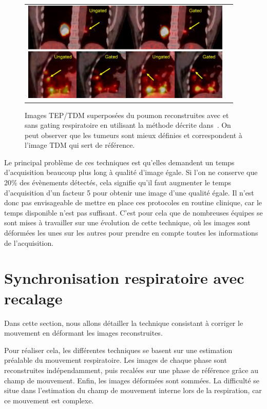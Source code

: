 \begin{figure}[h!]
	\begin{center}
		\begin{tabular}{c c}
			\includegraphics[width=10cm]{images/chang2010}
		\end{tabular}
	\end{center}
	\caption{Images TEP/TDM superposées du poumon reconstruites avec et sans gating respiratoire en utilisant la méthode décrite dans~\cite{GuopingChang2010Implementation}. On peut observer que les tumeurs sont mieux définies et correspondent à l'image TDM qui sert de référence.} 
	\label{fig:chang2010}
\end{figure}

Le principal problème de ces techniques est qu'elles demandent un temps d'acquisition beaucoup plus long à qualité d'image égale. Si l'on ne conserve que 20\% des évènements détectés, cela signifie qu'il faut augmenter le temps d'acquisition d'un facteur 5 pour obtenir une image d'une qualité égale. Il n'est donc pas envisageable de mettre en place ces protocoles en routine clinique, car le temps disponible n'est pas suffisant. C'est pour cela que de nombreuses équipes se sont mises à travailler sur une évolution de cette technique, où les images sont déformées les unes sur les autres pour prendre en compte toutes les informations de l'acquisition.

\section{Synchronisation respiratoire avec recalage}
\label{lab:corrPostRecon}

Dans cette section, nous allons détailler la technique consistant à corriger  le mouvement en déformant les images reconstruites.

Pour réaliser cela, les différentes techniques se basent sur une estimation préalable du mouvement respiratoire. Les images de chaque phase sont reconstruites indépendamment, puis recalées sur une phase de référence grâce au champ de mouvement. Enfin, les images déformées sont sommées. La difficulté se situe dans l'estimation du champ de mouvement interne lors de la respiration, car ce mouvement est complexe.

